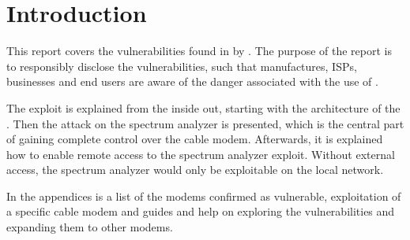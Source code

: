 \chapter{Introduction}

This report covers the \exploitname{} vulnerabilities found in \product{} by \Lyrebirds.
The purpose of the report is to responsibly disclose the vulnerabilities, such that manufactures, ISPs, businesses and end users are aware of the danger associated with the use of \product.

The exploit is explained from the inside out, starting with the architecture of the \product.
Then the attack on the spectrum analyzer is presented, which is the central part of gaining complete control over the cable modem.
Afterwards, it is explained how to enable remote access to the spectrum analyzer exploit. 
Without external access, the spectrum analyzer would only be exploitable on the local network.

In the appendices is a list of the modems confirmed as vulnerable, exploitation of a specific cable modem and guides and help on exploring the vulnerabilities and expanding them to other modems.

